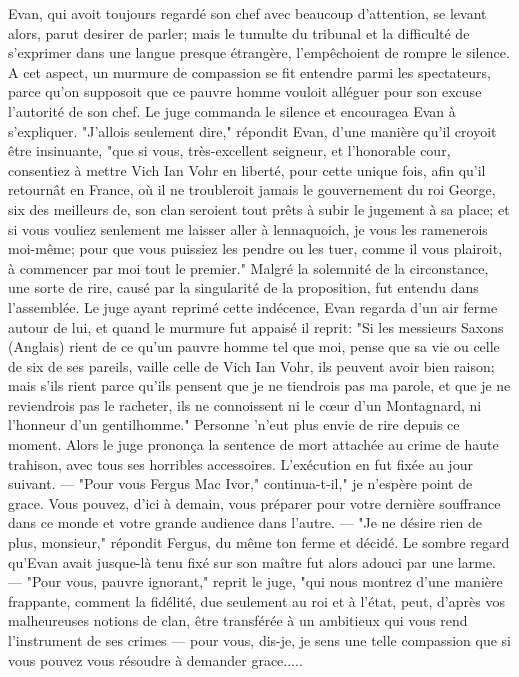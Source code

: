 {Evan, qui avoit toujours regardé son chef avec beaucoup d'attention, se levant alors, parut desirer de parler; mais le tumulte du tribunal et la difficulté de s'exprimer dans une langue presque étrangère, l'empêchoient de rompre le silence. A cet aspect, un murmure de compassion se fit entendre parmi les spectateurs, parce qu'on supposoit que ce pauvre homme vouloit alléguer pour son excuse l'autorité de son chef. Le juge commanda le silence et encouragea Evan à s'expliquer. "J'allois seulement dire," répondit Evan, d'une manière qu'il croyoit être insinuante, "que si vous, très-excellent seigneur, et l'honorable cour, consentiez à mettre Vich Ian Vohr en liberté, pour cette unique fois, afin qu'il retournât en France, où il ne troubleroit jamais le gouvernement du roi George, six des meilleurs de, son clan seroient tout prêts à subir le jugement à sa place; et si vous vouliez senlement me laisser aller à lennaquoich,\setcounter{page}{375} je vous les ramenerois moi-même; pour que vous puissiez les pendre ou les tuer, comme il vous plairoit, à commencer par moi tout le premier."
Malgré la solemnité de la circonstance, une sorte de rire, causé par la singularité de la proposition, fut entendu dans l'assemblée. Le juge ayant reprimé cette indécence, Evan regarda d'un air ferme autour de lui, et quand le murmure fut appaisé il reprit:
"Si les messieurs Saxons (Anglais) rient de ce qu'un pauvre homme tel que moi, pense que sa vie ou celle de six de ses pareils, vaille celle de Vich Ian Vohr, ils peuvent avoir bien raison; mais s'ils rient parce qu'ils pensent que je ne tiendrois pas ma parole, et que je ne reviendrois pas le racheter, ils ne connoissent ni le cœur d'un Montagnard, ni l'honneur d'un gentilhomme."
Personne 'n'eut plus envie de rire depuis ce moment.
Alors le juge prononça la sentence de mort attachée au crime de haute trahison, avec tous ses horribles accessoires. L'exécution en fut fixée au jour suivant. — "Pour vous Fergus Mac Ivor," continua-t-il," je n'espère point de grace. Vous pouvez, d'ici à demain, vous préparer pour votre\setcounter{page}{376} dernière souffrance dans ce monde et votre grande audience dans l’autre.
— "Je ne désire rien de plus, monsieur," répondit Fergus, du même ton ferme et décidé.
Le sombre regard qu’Evan avait jusque-là tenu fixé sur son maître fut alors adouci par une larme. — "Pour vous, pauvre ignorant," reprit le juge, "qui nous montrez d’une manière frappante, comment la fidélité, due seulement au roi et à l’état, peut, d’après vos malheureuses notions de clan, être transférée à un ambitieux qui vous rend l’instrument de ses crimes — pour vous, dis-je, je sens une telle compassion que si vous pouvez vous résoudre à demander grace.....
}
